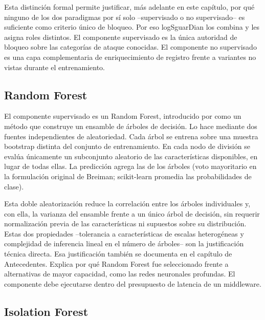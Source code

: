 Esta distinción formal permite justificar, más adelante en este capítulo, por qué ninguno de los dos paradigmas por sí solo --supervisado o no supervisado-- es suficiente como criterio único de bloqueo. Por eso logSguarDian los combina y les asigna roles distintos. El componente supervisado es la única autoridad de bloqueo sobre las categorías de ataque conocidas. El componente no supervisado es una capa complementaria de enriquecimiento de registro frente a variantes no vistas durante el entrenamiento.

\subsection{Random Forest}

El componente supervisado es un Random Forest, introducido por \textcite{breiman2001} como un método que construye un ensamble de árboles de decisión. Lo hace mediante dos fuentes independientes de aleatoriedad. Cada árbol se entrena sobre una muestra bootstrap distinta del conjunto de entrenamiento. En cada nodo de división se evalúa únicamente un subconjunto aleatorio de las características disponibles, en lugar de todas ellas. La predicción agrega las de los árboles (voto mayoritario en la formulación original de Breiman; scikit-learn promedia las probabilidades de clase).

Esta doble aleatorización reduce la correlación entre los árboles individuales y, con ella, la varianza del ensamble frente a un único árbol de decisión, sin requerir normalización previa de las características ni supuestos sobre su distribución. Estas dos propiedades --tolerancia a características de escalas heterogéneas y complejidad de inferencia lineal en el número de árboles-- son la justificación técnica directa. Esa justificación también se documenta en el capítulo de Antecedentes. Explica por qué Random Forest fue seleccionado frente a alternativas de mayor capacidad, como las redes neuronales profundas. El componente debe ejecutarse dentro del presupuesto de latencia de un middleware.

\subsection{Isolation Forest}

